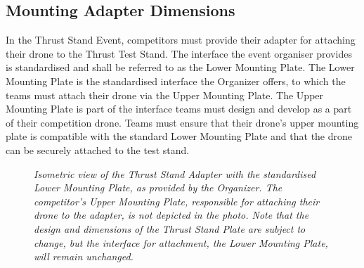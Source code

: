 \documentclass{article}
\begin{document}
\subsection{Mounting Adapter Dimensions}
In the Thrust Stand Event, competitors must provide their adapter for attaching their drone to the Thrust Test Stand. The interface the event organiser provides is standardised and shall be referred to as the Lower Mounting Plate. The Lower Mounting Plate is the standardised interface the Organizer offers, to which the teams must attach their drone via the Upper Mounting Plate. The Upper Mounting Plate is part of the interface teams must design and develop as a part of their competition drone. Teams must ensure that their drone's upper mounting plate is compatible with the standard Lower Mounting Plate and that the drone can be securely attached to the test stand. 
\begin{figure}[h!]
  \centering
 \caption{\textit{Isometric view of the Thrust Stand Adapter with the standardised Lower Mounting Plate, as provided by the Organizer. The competitor's Upper Mounting Plate, responsible for attaching their drone to the adapter, is not depicted in the photo. Note that the design and dimensions of the Thrust Stand Plate are subject to change, but the interface for attachment, the Lower Mounting Plate, will remain unchanged.}}
 \end{figure}
\end{document}
